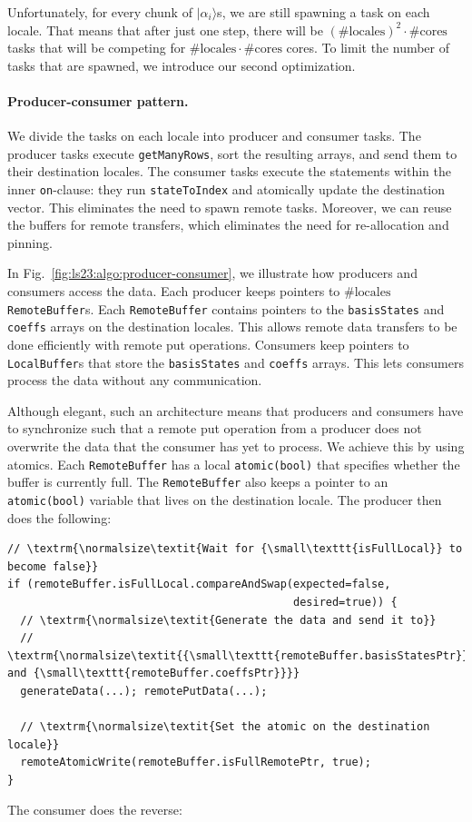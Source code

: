 Unfortunately, for every chunk of $|\alpha_i\rangle$s, we are still spawning a task on each locale. That means that after just one step, there will be $(\#\text{locales})^2 \cdot \#\text{cores}$ tasks that will be competing for $\#\text{locales} \cdot \#\text{cores}$ cores. To limit the number of tasks that are spawned, we introduce our second optimization.

\paragraph{Producer-consumer pattern.}
We divide the tasks on each locale into producer and consumer tasks. The producer tasks execute \verb|getManyRows|, sort the resulting arrays, and send them to their destination locales. The consumer tasks execute the statements within the inner \verb|on|-clause: they run \verb|stateToIndex| and atomically update the destination vector. This eliminates the need to spawn remote tasks. Moreover, we can reuse the buffers for remote transfers, which eliminates the need for re-allocation and pinning.

In Fig.~\ref{fig:ls23:algo:producer-consumer}, we illustrate how producers and consumers access the data. Each producer keeps pointers to $\#\text{locales}$ \verb|RemoteBuffer|s. Each \verb|RemoteBuffer| contains pointers to the \verb|basisStates| and \verb|coeffs| arrays on the destination locales. This allows remote data transfers to be done efficiently with remote put operations. Consumers keep pointers to \verb|LocalBuffer|s that store the \verb|basisStates| and \verb|coeffs| arrays. This lets consumers process the data without any communication.

Although elegant, such an architecture means that producers and consumers have to synchronize such that a remote put operation from a producer does not overwrite the data that the consumer has yet to process. We achieve this by using atomics. Each \verb|RemoteBuffer| has a local \verb|atomic(bool)| that specifies whether the buffer is currently full. The \verb|RemoteBuffer| also keeps a pointer to an \verb|atomic(bool)| variable that lives on the destination locale. The producer then does the following:

\begin{verbatim}
// \textrm{\normalsize\textit{Wait for {\small\texttt{isFullLocal}} to become false}}
if (remoteBuffer.isFullLocal.compareAndSwap(expected=false,
                                            desired=true)) {
  // \textrm{\normalsize\textit{Generate the data and send it to}}
  // \textrm{\normalsize\textit{{\small\texttt{remoteBuffer.basisStatesPtr}} and {\small\texttt{remoteBuffer.coeffsPtr}}}}
  generateData(...); remotePutData(...);

  // \textrm{\normalsize\textit{Set the atomic on the destination locale}}
  remoteAtomicWrite(remoteBuffer.isFullRemotePtr, true);
}
\end{verbatim}
The consumer does the reverse:

